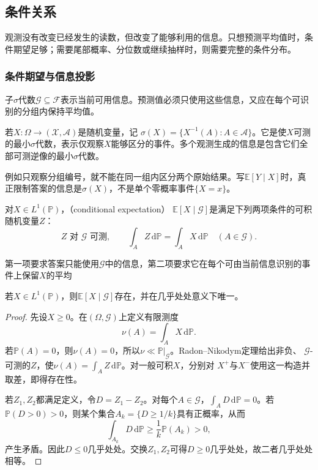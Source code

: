 \subsection{条件关系}
观测没有改变已经发生的读数，但改变了能够利用的信息。只想预测平均值时，条件期望足够；需要尾部概率、分位数或继续抽样时，则需要完整的条件分布。

\subsubsection{条件期望与信息投影}
\label{sec:rv-conditional-expectation}
子\(\sigma\)代数\(\mathcal{G}\subseteq\mathcal{F}\)表示当前可用信息。预测值必须只使用这些信息，又应在每个可识别的分组内保持平均值。
\begin{definition}[观测生成的信息]
  \label{def:probability-generated-information}
若\(X:\Omega\to(\mathcal X,\mathcal A)\)是随机变量，记
\(\sigma(X)=\{X^{-1}(A):A\in\mathcal A\}\)。它是使\(X\)可测的最小\(\sigma\)代数，表示仅观察\(X\)能够区分的事件。多个观测生成的信息是包含它们全部可测逆像的最小\(\sigma\)代数。
\end{definition}
例如只观察分组编号，就不能在同一组内区分两个原始结果。写\(\mathbb E[Y\mid X]\)时，真正限制答案的信息是\(\sigma(X)\)，不是单个零概率事件\(\{X=x\}\)。
\begin{definition}[条件期望]
  \label{def:probability-conditional-expectation}
对\(X\in L^1(\mathbb P)\)，（conditional expectation）
\(\mathbb{E}[X\mid\mathcal{G}]\)是满足下列两项条件的可积随机变量\(Z\)：
\[ Z\text{ 对 }\mathcal{G}\text{ 可测},
  \qquad\int_A Z\,\mathrm{d}\mathbb{P}=\int_A X\,\mathrm{d}\mathbb{P}\quad(A\in\mathcal{G}). \]
\end{definition}
第一项要求答案只能使用\(\mathcal{G}\)中的信息，第二项要求它在每个可由当前信息识别的事件上保留\(X\)的平均

\begin{theorem}[条件期望的存在与唯一性]
\label{thm:probability-conditional-expectation-existence}
若\(X\in L^1(\mathbb{P})\)，则\(\mathbb{E}[X\mid\mathcal{G}]\)存在，并在几乎处处意义下唯一。
\end{theorem}

\begin{proof}
先设\(X\geq0\)。在\((\Omega,\mathcal{G})\)上定义有限测度
\[ \nu(A)=\int_A X\,\mathrm{d}\mathbb{P}. \]
若\(\mathbb{P}(A)=0\)，则\(\nu(A)=0\)，所以\(\nu\ll\mathbb{P}|_{\mathcal{G}}\)。Radon--Nikodym定理给出非负、
\(\mathcal{G}\)-可测的\(Z\)，使\(\nu(A)=\int_A Z\,\mathrm{d}\mathbb{P}\)。对一般可积\(X\)，分别对
\(X^+\)与\(X^-\)使用这一构造并取差，即得存在性。

若\(Z_1,Z_2\)都满足定义，令\(D=Z_1-Z_2\)。对每个\(A\in\mathcal{G}\)，\(\int_A D\,\mathrm{d}\mathbb{P}=0\)。若
\(\mathbb{P}(D>0)>0\)，则某个集合\(A_k=\{D\geq1/k\}\)具有正概率，从而
\[ \int_{A_k}D\,\mathrm{d}\mathbb{P}
  \geq\frac{1}{k}\mathbb{P}(A_k)>0, \]
产生矛盾。因此\(D\leq0\)几乎处处。交换\(Z_1,Z_2\)可得\(D\geq0\)几乎处处，故二者几乎处处相等。
\end{proof}

